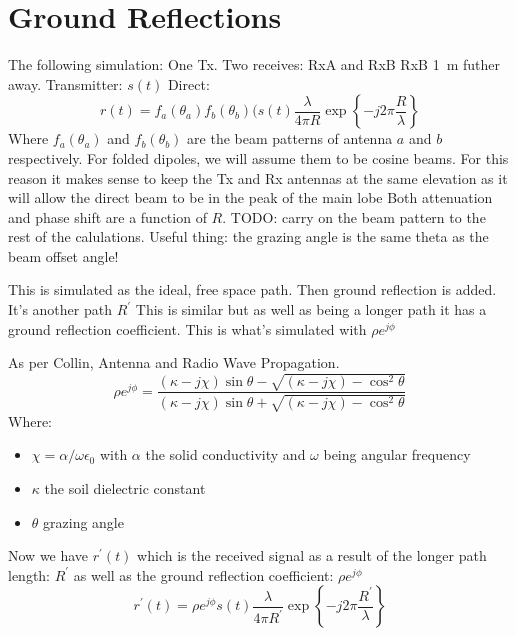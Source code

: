 \section{Ground Reflections}

The following simulation:
One Tx.
Two receives: RxA and RxB
RxB \SI{1}{\meter} futher away. 
Transmitter: \(s(t)\)
Direct:
\begin{equation}
  r(t) = f_a(\theta_a)f_b(\theta_b)(s(t)\frac{\lambda}{4\pi R} \exp\left\{ -j 2 \pi \frac{R}{\lambda}\right\}
\end{equation}
Where \(f_a(\theta_a)\) and \(f_b(\theta_b)\) are the beam patterns of antenna \(a\) and \(b\) respectively. For folded dipoles, we will assume them to be cosine beams. For this reason it makes sense to keep the Tx and Rx antennas at the same elevation as it will allow the direct beam to be in the peak of the main lobe
Both attenuation and phase shift are a function of \(R\).
TODO: carry on the beam pattern to the rest of the calulations. Useful thing: the grazing angle is the same theta as the beam offset angle!

This is simulated as the ideal, free space path.
Then ground reflection is added. It's another path \(R^\prime\)
This is similar but as well as being a longer path it has a ground reflection coefficient. 
This is what's simulated with \(\rho e^{j \phi}\)

As per Collin, Antenna and Radio Wave Propagation.
\begin{equation}
  \rho e^{j\phi} = \frac
    {(\kappa - j\chi)\sin\theta - \sqrt{(\kappa -j\chi) - \cos^2\theta}}
    {(\kappa - j\chi)\sin\theta + \sqrt{(\kappa -j\chi) - \cos^2\theta}}
\end{equation}
Where:
\begin{itemize}
  \item \(\chi = \alpha/\omega\epsilon_0\) with \(\alpha\) the solid conductivity and \(\omega\) being angular frequency
  \item \(\kappa\) the soil dielectric constant
  \item \(\theta\) grazing angle
\end{itemize}

Now we have \(r^\prime(t)\) which is the received signal as a result of the longer path length: \(R^\prime\) as well as the ground reflection coefficient: \(\rho e^{j\phi}\)
\begin{equation}
  r^\prime(t) = \rho e^{j\phi} s(t)\frac{\lambda}{4\pi R^\prime} \exp\left\{ -j 2 \pi \frac{R^\prime}{\lambda}\right\}
\end{equation}

